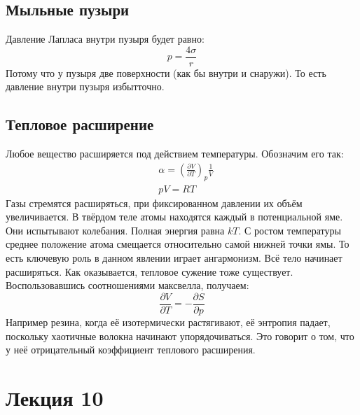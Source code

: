 \documentclass[a4paper, 12pt]{article}
\begin{document}
	\subsection{Мыльные пузыри}
	Давление Лапласа внутри пузыря будет равно:
	\begin{equation*}
		p = \frac{4 \sigma}{r}
	\end{equation*}
	Потому что у пузыря две поверхности (как бы внутри и снаружи). То есть давление внутри пузыря избытточно. 
	\subsection{Тепловое расширение}
	Любое вещество расширяется под действием температуры. Обозначим его так:
	\begin{equation*}
		\begin{aligned}
			& \alpha =( \frac{\partial V}{\partial T} )_{p}\frac{1}{V} \\
			& pV = RT                                                  
		\end{aligned}
	\end{equation*}
	Газы стремятся расширяться, при фиксированном давлении их объём увеличивается. В твёрдом теле атомы находятся каждый в потенциальной яме. Они испытывают колебания. Полная энергия равна $kT$. С ростом температуры среднее положение атома смещается относительно самой нижней точки ямы. То есть ключевую роль в данном явлении играет ангармонизм. Всё тело начинает расширяться. Как оказывается, тепловое сужение тоже существует. Воспользовавшись соотношениями максвелла, получаем:
	\begin{equation*}
		\frac{\partial V}{\partial T} = - \frac{\partial S}{\partial p}
	\end{equation*}
	Например резина, когда её изотермически растягивают, её энтропия падает, поскольку хаотичные волокна начинают упорядочиваться. Это говорит о том, что у неё отрицательный коэффициент теплового расширения.
	\section{Лекция 10}
\end{document}
